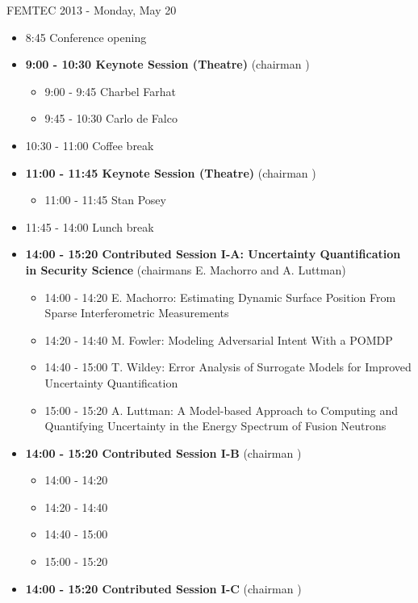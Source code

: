 \documentclass[10pt, A4]{article}%
\begin{document}
\centerline{\huge FEMTEC 2013 - Monday, May 20}
\vspace{4mm}

\begin{itemize}    
  \item 8:45 Conference opening
  \item {\bf 9:00 - 10:30 Keynote Session (Theatre)} (chairman ) 
  \begin{itemize}
    \item 9:00 - 9:45 Charbel Farhat
    \item 9:45 - 10:30 Carlo de Falco
  \end{itemize}
  \item 10:30 - 11:00 Coffee break
  \item {\bf 11:00 - 11:45 Keynote Session (Theatre)} (chairman ) 
  \begin{itemize}
    \item 11:00 - 11:45 Stan Posey
  \end{itemize}
  \item 11:45 - 14:00 Lunch break      
  \item {\bf 14:00 - 15:20 Contributed Session I-A: Uncertainty Quantification in Security Science} (chairmans E. Machorro and A. Luttman) 
  \begin{itemize}
    \item 14:00 - 14:20 {E. Machorro}: {Estimating Dynamic Surface Position From Sparse Interferometric Measurements}
    \item 14:20 - 14:40 {M. Fowler}: {Modeling Adversarial Intent With a POMDP}
    \item 14:40 - 15:00 {T. Wildey}: {Error Analysis of Surrogate Models for Improved Uncertainty Quantification}
    \item 15:00 - 15:20 {A. Luttman}: {A Model-based Approach to Computing and Quantifying Uncertainty in the Energy Spectrum of Fusion Neutrons}
  \end{itemize}
  \item {\bf 14:00 - 15:20 Contributed Session I-B} (chairman ) 
  \begin{itemize}
    \item 14:00 - 14:20 
    \item 14:20 - 14:40 
    \item 14:40 - 15:00 
    \item 15:00 - 15:20 
  \end{itemize}
    \item {\bf 14:00 - 15:20 Contributed Session I-C} (chairman ) 
  \begin{itemize}

\end{itemize}
\end{itemize}
\end{document}
